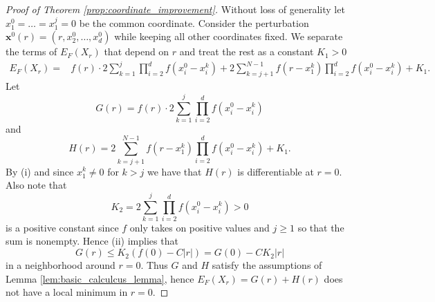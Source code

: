 \documentclass[a4paper,12pt]{article}
\numberwithin{equation}{section}
\theoremstyle{definition}
\newtheorem*{rem*}{Remark}
\newcommand{\bx}{\mathbf{x}}
\begin{document}

\begin{proof} [Proof of Theorem \ref{prop:coordinate_improvement}]
    Without loss of generality let  $x^0_1 = \dots = x^j_1=0$ be the common coordinate. Consider the perturbation $\bx^0(r) = (r, x_2^0, \dots, x_d^0)$ while keeping all other coordinates fixed. We separate the terms of $E_F (X_r)$ that depend on $r$ and treat the rest as a constant $K_1>0$
	\begin{align*}
		E_F (X_r ) = & f(r) \cdot 2\sum_{k = 1}^{j} \prod_{i=2}^d f(x_i^0-x_i^k) 
		 +  2\sum_{k = j+1}^{N-1} f(r - x_1^k) \prod_{i=2}^d f(x_i^0-x_i^k) + K_1.
	\end{align*}
	Let
	$$
	G(r) = f(r) \cdot 2\sum_{k = 1}^{j} \prod_{i=2}^d f(x_i^0-x_i^k)
    $$
    and
    $$
	H(r)  =  2\sum_{k = j+1}^{N-1} f(r - x_1^k) \prod_{i=2}^d f(x_i^0-x_i^k) + K_1.
	$$
	By (i) and since $x_1^k \neq 0$ for $k > j$ we have that $H(r)$ is differentiable at $r=0$. Also note that
	$$
    K_2 = 2\sum_{k = 1}^{j} \prod_{i=2}^d f(x_i^0-x_i^k) > 0
	$$
	is a positive constant since $f$ only takes on positive values and $j \geq 1$ so that the sum is nonempty. Hence (ii) implies that
	$$
	G(r) \leq K_2 (f(0) - C |r|)  = G(0) - C K_2 |r|
	$$
	in a neighborhood around $r = 0$. Thus $G$ and $H$ satisfy the assumptions of Lemma \ref{lem:basic_calculcus_lemma}, hence $E_F (X_r) = G(r) +H(r)$ does not have a local minimum in $r=0$.
\end{proof}



\end{document}
